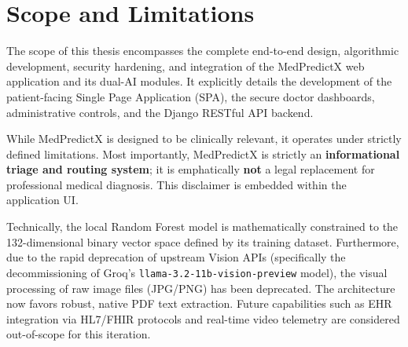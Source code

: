 \section{Scope and Limitations}

The scope of this thesis encompasses the complete end-to-end design, algorithmic development, security hardening, and integration of the MedPredictX web application and its dual-AI modules. It explicitly details the development of the patient-facing Single Page Application (SPA), the secure doctor dashboards, administrative controls, and the Django RESTful API backend.

While MedPredictX is designed to be clinically relevant, it operates under strictly defined limitations. Most importantly, MedPredictX is strictly an \textbf{informational triage and routing system}; it is emphatically \textbf{not} a legal replacement for professional medical diagnosis. This disclaimer is embedded within the application UI.

Technically, the local Random Forest model is mathematically constrained to the 132-dimensional binary vector space defined by its training dataset. Furthermore, due to the rapid deprecation of upstream Vision APIs (specifically the decommissioning of Groq's \texttt{llama-3.2-11b-vision-preview} model), the visual processing of raw image files (JPG/PNG) has been deprecated. The architecture now favors robust, native PDF text extraction. Future capabilities such as EHR integration via HL7/FHIR protocols and real-time video telemetry are considered out-of-scope for this iteration.
